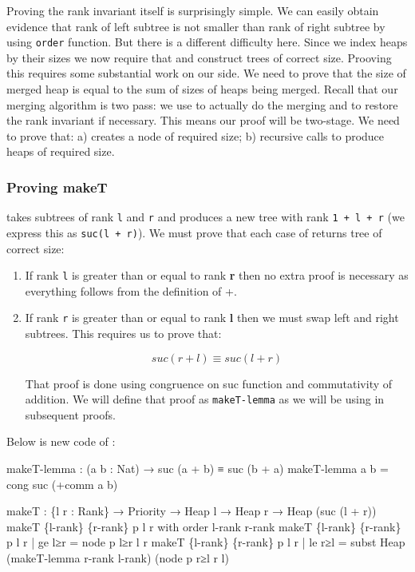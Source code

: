 Proving the rank invariant itself is surprisingly simple. We can easily obtain evidence that rank of left subtree is not smaller than rank of right subtree by using \texttt{order} function. But there is a different difficulty here. Since we index heaps by their sizes we now require that \makeT and \merge construct trees of correct size. Prooving this requires some substantial work on our side. We need to prove that the size of merged heap is equal to the sum of sizes of heaps being merged. Recall that our merging algorithm is two pass: we use \merge to actually do the merging and \makeT to
restore the rank invariant if necessary. This means our proof will be two-stage. We need to prove that: a) \makeT creates a node of required size; b) recursive calls to \merge produce heaps of required size.

\subsubsection{Proving makeT}

\makeT takes subtrees of rank \texttt{l} and \texttt{r} and produces a new tree with rank \texttt{1 + l + r} (we express this as \texttt{suc(l + r)}). We must prove that each case of \makeT returns tree of correct size:

\begin{enumerate}
 \item If rank \texttt{l} is greater than or equal to rank \textbf{r} then no extra proof is necessary as everything follows from the definition of +.
 \item If rank \texttt{r} is greater than or equal to rank \textbf{l} then we must swap left and right subtrees. This requires us to prove that:

\begin{equation*}
suc (r + l) ≡ suc (l + r)
\end{equation*}

That proof is done using congruence on suc function and commutativity of addition. We will define that proof as \texttt{makeT-lemma} as we will be using in subsequent proofs.
\end{enumerate}

Below is new code of \makeT:

\begin{code}
makeT-lemma : (a b : Nat) → suc (a + b) ≡ suc (b + a)
makeT-lemma a b = cong suc (+comm a b)

makeT : \{l r : Rank\} → Priority → Heap l → Heap r → Heap (suc (l + r))
makeT \{l-rank\} \{r-rank\} p l r with order l-rank r-rank
makeT \{l-rank\} \{r-rank\} p l r | ge l≥r
  = node p l≥r l r
makeT \{l-rank\} \{r-rank\} p l r | le r≥l
  = subst Heap (makeT-lemma r-rank l-rank) (node p r≥l r l)
\end{code}

